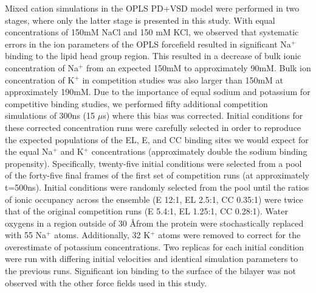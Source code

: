 \begin{refsection}
Mixed cation simulations in the OPLS PD+VSD model were performed in two stages, where only the latter stage is presented in this study. With equal concentrations of 150mM NaCl and 150 mM KCl, we observed that systematic errors in the ion parameters of the OPLS forcefield resulted in significant Na$^+$ binding to the lipid head group region. This resulted in a decrease of bulk ionic concentration of Na$^+$ from an expected 150mM to approximately 90mM. Bulk ion concentration of K$^+$ in competition studies was also larger than 150mM at approximately 190mM. Due to the importance of equal sodium and potassium for competitive binding studies, we performed fifty additional competition simulations of 300ns (15 $\mu$s) where this bias was corrected. Initial conditions for these corrected concentration runs were carefully selected in order to reproduce the expected populations of the EL, E, and CC binding sites we would expect for the equal Na$^+$ and K$^+$ concentrations (approximately double the sodium binding propensity). Specifically, twenty-five initial conditions were selected from a pool of the forty-five final frames of the first set of competition runs (at approximately t=500ns). Initial conditions were randomly selected from the pool until the ratios of ionic occupancy across the ensemble (E 12:1, EL 2.5:1, CC 0.35:1) were twice that of the original competition runs (E 5.4:1, EL 1.25:1, CC 0.28:1). Water oxygens in a region outside of 30 \AA from the protein were stochastically replaced with 55 Na$^+$ atoms. Additionally, 32 K$^+$ atoms were removed to correct for the overestimate of potassium concentrations. Two replicas for each initial condition were run with differing initial velocities and identical simulation parameters to the previous runs. Significant ion binding to the surface of the bilayer was not observed with the other force fields used in this study.


\end{refsection}
